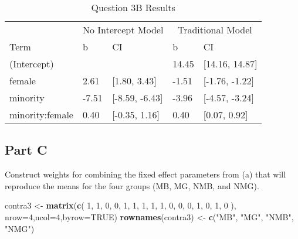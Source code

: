 \documentclass[]{article}
\newenvironment{Shaded}{\begin{snugshade}}{\end{snugshade}}
\newcommand{\KeywordTok}[1]{\textcolor[rgb]{0.13,0.29,0.53}{\textbf{#1}}}
\newcommand{\DataTypeTok}[1]{\textcolor[rgb]{0.13,0.29,0.53}{#1}}
\newcommand{\DecValTok}[1]{\textcolor[rgb]{0.00,0.00,0.81}{#1}}
\newcommand{\StringTok}[1]{\textcolor[rgb]{0.31,0.60,0.02}{#1}}
\newcommand{\OtherTok}[1]{\textcolor[rgb]{0.56,0.35,0.01}{#1}}
\newcommand{\NormalTok}[1]{#1}
\begin{document}
\begin{table}

\caption{\label{tab:unnamed-chunk-10}Question 3B Results}
\centering
\begin{tabular}[t]{lllll}
\toprule
\multicolumn{1}{c}{ } & \multicolumn{2}{c}{No Intercept Model} & \multicolumn{2}{c}{Traditional Model} \\
\cmidrule(l{2pt}r{2pt}){2-3} \cmidrule(l{2pt}r{2pt}){4-5}
Term & b & CI & b & CI\\
\midrule
(Intercept) &  &  & 14.45 & [14.16, 14.87]\\
female & 2.61 & [1.80, 3.43] & -1.51 & [-1.76, -1.22]\\
minority & -7.51 & [-8.59, -6.43] & -3.96 & [-4.57, -3.24]\\
minority:female & 0.40 & [-0.35, 1.16] & 0.40 & [0.07, 0.92]\\
\bottomrule
\end{tabular}
\end{table}

\subsection{Part C}\label{part-c-1}

Construct weights for combining the fixed effect parameters from (a)
that will reproduce the means for the four groups (MB, MG, NMB, and
NMG).

\begin{Shaded}
\begin{Highlighting}[]
\NormalTok{contra3 <-}\StringTok{ }\KeywordTok{matrix}\NormalTok{(}\KeywordTok{c}\NormalTok{(}
  \DecValTok{1}\NormalTok{, }\DecValTok{1}\NormalTok{, }\DecValTok{0}\NormalTok{, }\DecValTok{0}\NormalTok{,}
  \DecValTok{1}\NormalTok{, }\DecValTok{1}\NormalTok{, }\DecValTok{1}\NormalTok{, }\DecValTok{1}\NormalTok{,}
  \DecValTok{1}\NormalTok{, }\DecValTok{0}\NormalTok{, }\DecValTok{0}\NormalTok{, }\DecValTok{0}\NormalTok{,}
  \DecValTok{1}\NormalTok{, }\DecValTok{0}\NormalTok{, }\DecValTok{1}\NormalTok{, }\DecValTok{0}
\NormalTok{), }\DataTypeTok{nrow=}\DecValTok{4}\NormalTok{,}\DataTypeTok{ncol=}\DecValTok{4}\NormalTok{,}\DataTypeTok{byrow=}\OtherTok{TRUE}\NormalTok{)}
\KeywordTok{rownames}\NormalTok{(contra3) <-}\StringTok{ }\KeywordTok{c}\NormalTok{(}\StringTok{"MB"}\NormalTok{, }\StringTok{"MG"}\NormalTok{, }\StringTok{"NMB"}\NormalTok{, }\StringTok{"NMG"}\NormalTok{)}
\end{Highlighting}
\end{Shaded}
\end{document}
